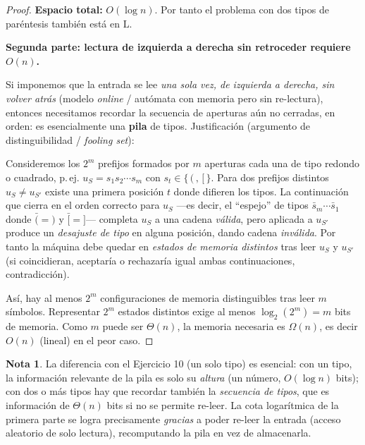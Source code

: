 \documentclass[11pt,a4paper]{article}
\theoremstyle{plain}
\theoremstyle{definition}
\newtheorem*{nota}{Nota}
\newcommand{\Lclass}{\mathrm{L}}
\begin{document}
\begin{proof}
\textbf{Espacio total:} $O(\log n)$. Por tanto el problema con dos tipos de
par\'entesis tambi\'en est\'a en $\Lclass$.

\medskip
\textbf{Segunda parte: lectura de izquierda a derecha sin retroceder requiere
$O(n)$.}

Si imponemos que la entrada se lee \emph{una sola vez, de izquierda a derecha, sin
volver atr\'as} (modelo \emph{online} / aut\'omata con memoria pero sin re-lectura),
entonces necesitamos recordar la secuencia de aperturas a\'un no cerradas, en orden:
es esencialmente una \textbf{pila} de tipos. Justificaci\'on (argumento de
distinguibilidad / \emph{fooling set}):

Consideremos los $2^{m}$ prefijos formados por $m$ aperturas cada una de tipo redondo
o cuadrado, p.\,ej. $u_S = s_1 s_2\cdots s_m$ con $s_t\in\{\,(\,,\,[\,\}$. Para dos
prefijos distintos $u_S\neq u_{S'}$ existe una primera posici\'on $t$ donde difieren
los tipos. La continuaci\'on que cierra en el orden correcto para $u_S$ ---es decir,
el ``espejo'' de tipos $\bar s_m\cdots\bar s_1$ donde $\bar{(}=)$ y $\bar{[}=]$---
completa $u_S$ a una cadena \emph{v\'alida}, pero aplicada a $u_{S'}$ produce un
\emph{desajuste de tipo} en alguna posici\'on, dando cadena \emph{inv\'alida}. Por
tanto la m\'aquina debe quedar en \emph{estados de memoria distintos} tras leer
$u_S$ y $u_{S'}$ (si coincidieran, aceptar\'ia o rechazar\'ia igual ambas
continuaciones, contradicci\'on).

As\'i, hay al menos $2^{m}$ configuraciones de memoria distinguibles tras leer $m$
s\'imbolos. Representar $2^{m}$ estados distintos exige al menos
$\log_2(2^{m}) = m$ bits de memoria. Como $m$ puede ser $\Theta(n)$, la memoria
necesaria es $\Omega(n)$, es decir $O(n)$ (lineal) en el peor caso.
\end{proof}

\begin{nota}
La diferencia con el Ejercicio 10 (un solo tipo) es esencial: con un tipo, la
informaci\'on relevante de la pila es solo su \emph{altura} (un n\'umero, $O(\log n)$
bits); con dos o m\'as tipos hay que recordar tambi\'en la \emph{secuencia de tipos},
que es informaci\'on de $\Theta(n)$ bits si no se permite re-leer. La cota
logar\'itmica de la primera parte se logra precisamente \emph{gracias} a poder
re-leer la entrada (acceso aleatorio de solo lectura), recomputando la pila en vez de
almacenarla.
\end{nota}

\end{document}
